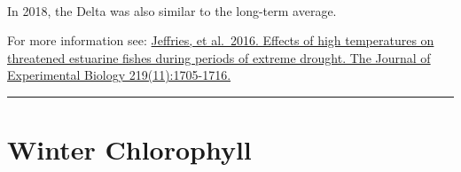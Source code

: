 \documentclass[
]{book}
\begin{document}
\begin{panel-grid}
\begin{columns-nocenter}
\begin{column800}
\end{column800}

\begin{column40}

~

\end{column40}

\begin{column800}

In 2018, the Delta was also similar to the long-term average.

\end{column800}

\end{columns-nocenter}

\end{panel-grid}

\begin{disclaimer}
For more information see:
\href{https://jeb.biologists.org/content/219/11/1705.short}{Jeffries, et
al.~2016. Effects of high temperatures on threatened estuarine fishes
during periods of extreme drought. The Journal of Experimental Biology
219(11):1705-1716.}
\end{disclaimer}

\begin{center}\rule{0.5\linewidth}{0.5pt}\end{center}

\hypertarget{winter-chlorophyll}{%
\section{Winter Chlorophyll}\label{winter-chlorophyll}}
\end{document}
